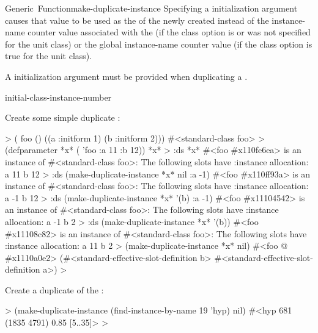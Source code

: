 \documentclass[10pt,twoside,english,pdftex]{article}
\begin{document}
\begin{functiondoc}{Generic~Function}{make-duplicate-instance}{%
     
     
    }
Specifying a  initialization argument causes that
value to be used as the  of the newly created
 instead of the instance-name counter value associated
with the  (if the
 class option is \nil{} or was
not specified for the unit class) or the global instance-name counter value
(if the  class option is true
for the unit class).

A  initialization argument must be provided when
duplicating a .

\begin{alsos}{initial-class-instance-number}
\end{alsos}

\fnexamples
Create some simple duplicate :
%
%
%
%
\W\supp
\begin{example}
  > ( foo () 
       ((a :initform 1)
        (b :initform 2)))
  #<standard-class foo>
  > (defparameter *x* ( 'foo :a 11 :b 12))
  *x*
  > :ds *x*
  #<foo #x110fe6ea> is an instance of #<standard-class foo>:
   The following slots have :instance allocation:
    a   11
    b   12
  > :ds (make-duplicate-instance *x* nil :a -1)
  #<foo #x110ff93a> is an instance of #<standard-class foo>:
   The following slots have :instance allocation:
    a   -1
    b   12\goodpagebreak
  > :ds (make-duplicate-instance *x* '(b) :a -1)
  #<foo #x11104542> is an instance of #<standard-class foo>:
   The following slots have :instance allocation:
    a   -1
    b   2
  > :ds (make-duplicate-instance *x* '(b))
  #<foo #x11108c82> is an instance of #<standard-class foo>:
   The following slots have :instance allocation:
    a   11
    b   2
  > (make-duplicate-instance *x* nil)
  #<foo @ #x1110a0e2>
  (#<standard-effective-slot-definition b>
   #<standard-effective-slot-definition a>)
  >
\end{example}

Create a duplicate of the   :
%
\W\supp
\begin{example}
  > (make-duplicate-instance (find-instance-by-name 19 'hyp) nil)
  #<hyp 681 (1835 4791) 0.85 [5..35]>
  >
\end{example}

\end{functiondoc}
\end{document}

